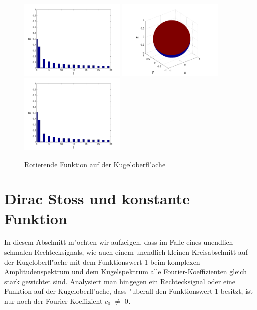 \begin{refsection}
\begin{figure}
\includegraphics[width=0.45\textwidth]{kugel/kSpektrum/Kugel_3_2.pdf}
\includegraphics[width=0.45\textwidth]{kugel/kSpektrum/Kugel_4_1.pdf}
\includegraphics[width=0.45\textwidth]{kugel/kSpektrum/Kugel_4_2.pdf}
\caption{Rotierende Funktion auf der Kugeloberfl"ache
\label{skript:Spektrum2}}
\end{figure}

\section{Dirac Stoss und konstante Funktion}

In diesem Abschnitt m"ochten wir aufzeigen, dass im Falle eines 
unendlich schmalen Rechtecksignals, wie auch einem unendlich kleinen 
Kreisabschnitt auf der Kugeloberfl"ache mit dem Funktionswert 1 beim 
komplexen Amplitudenspektrum und dem Kugelspektrum alle 
Fourier-Koeffizienten gleich stark gewichtet sind. 
Analysiert man hingegen ein Rechtecksignal oder eine Funktion auf der 
Kugeloberfl"ache, dass "uberall den Funktionswert 1 besitzt, ist nur 
noch der Fourier-Koeffizient $c_0$ $\neq$ 0.


\end{refsection}
